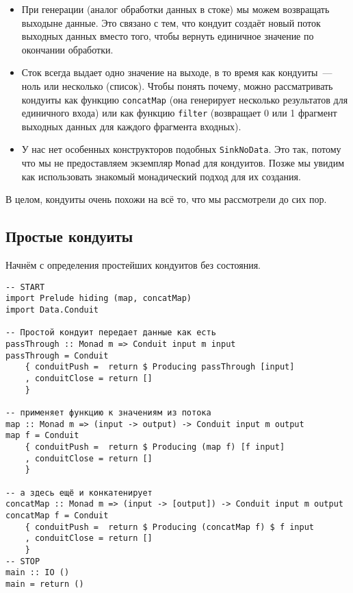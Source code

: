 \begin{itemize}  
\item При генерации (аналог обработки данных в стоке) мы можем возвращать выходыне данные.
Это связано с тем, что кондуит создаёт новый поток выходных данных вместо того, чтобы вернуть единичное значение по окончании обработки.
\item Сток всегда выдает одно значение на выходе, в то время как кондуиты~--- ноль или 
несколько (список). Чтобы понять почему, можно рассматривать кондуиты как функцию
\lstinline'concatMap' (она генерирует несколько результатов для единичного входа)
или как функцию \lstinline'filter' (возвращает 0 или 1 фрагмент выходных данных для каждого фрагмента входных).
\item У нас нет особенных конструкторов подобных \lstinline'SinkNoData'. Это так, потому что мы не
предоставляем
экземпляр \lstinline'Monad' для кондуитов. Позже мы увидим как использовать знакомый 
монадический подход для их создания.
\end{itemize}  
В целом, кондуиты очень похожи на всё то, что мы рассмотрели до сих пор.

\subsection{Простые кондуиты}

Начнём с определения простейших кондуитов без состояния.
\begin{lstlisting}
-- START
import Prelude hiding (map, concatMap)
import Data.Conduit

-- Простой кондуит передает данные как есть
passThrough :: Monad m => Conduit input m input
passThrough = Conduit
    { conduitPush =  return $ Producing passThrough [input]
    , conduitClose = return []
    }

-- применяет функцию к значениям из потока
map :: Monad m => (input -> output) -> Conduit input m output
map f = Conduit
    { conduitPush =  return $ Producing (map f) [f input]
    , conduitClose = return []
    }

-- а здесь ещё и конкатенирует
concatMap :: Monad m => (input -> [output]) -> Conduit input m output
concatMap f = Conduit
    { conduitPush =  return $ Producing (concatMap f) $ f input
    , conduitClose = return []
    }
-- STOP
main :: IO ()
main = return ()
\end{lstlisting}

